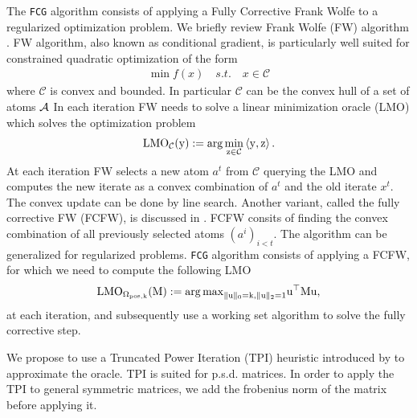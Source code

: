 The \texttt{FCG} algorithm consists of applying a Fully Corrective Frank Wolfe \citep{LacosteFCFW} to a regularized optimization problem. We briefly review Frank Wolfe (FW) algorithm \citep{frank1956algorithm}. FW algorithm, also known as conditional gradient, is particularly well suited for constrained quadratic optimization of the form
\begin{align*}
\min f(x) \quad s.t. \quad x\in \mathcal{C}
\end{align*}
where $\mathcal{C}$ is convex and bounded. In particular $\mathcal{C}$ can be the convex hull of a set of atoms $\mathcal{A}$  In each iteration FW needs to solve a linear minimization oracle (LMO) which solves the optimization problem
\begin{align}
\rm{{LMO}}_{\mathcal{C}}(y) := \arg\min_{z \in \mathcal{C}} \left\langle y,z \right\rangle.
\end{align}
At each iteration FW selects a new atom $a^t$ from $\mathcal{C}$ querying the LMO and computes the new iterate as a convex combination of $a^t$ and the old iterate $x^t$. The convex update can be done by line search. Another variant, called the fully corrective FW (FCFW), is discussed in \citet{LacosteFCFW}. FCFW consits of finding the convex combination of all previously selected atoms $(a^i)_{i<t}$. The algorithm can be generalized for regularized problems. \texttt{FCG} algorithm consists of applying a FCFW, for which we need to compute the following LMO 
\begin{align}
\rm{{LMO}}_{\Omega_{pos,k}}(M) :={\arg\max}_{\|u\|_0=k, \|u\|_ 2=1 } u^{\top}Mu,
\end{align}
at each iteration, and subsequently use a working set algorithm to solve the fully corrective step.

We propose to use a Truncated Power Iteration (TPI) heuristic introduced by \citet{yuan2013truncated} to approximate the oracle. TPI is suited for p.s.d. matrices. In order to apply the TPI to general symmetric matrices, we add the frobenius norm of the matrix before applying it. \\



